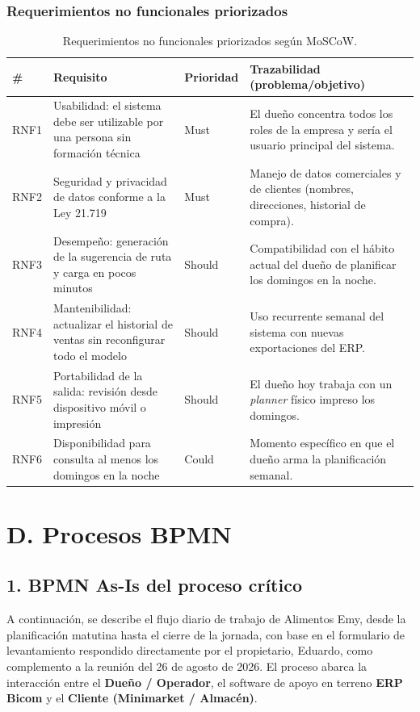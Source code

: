 \documentclass[10pt,a4paper]{article}
\begin{document}
\subsubsection*{Requerimientos no funcionales priorizados}

\begin{table}[H]
\centering
\small
\begin{tabular}{p{0.8cm} p{6.0cm} p{1.6cm} p{6.2cm}}
\toprule
\textbf{\#} & \textbf{Requisito} & \textbf{Prioridad} & \textbf{Trazabilidad (problema/objetivo)} \\
\midrule
RNF1 & Usabilidad: el sistema debe ser utilizable por una persona sin formación técnica & Must & El dueño concentra todos los roles de la empresa y sería el usuario principal del sistema. \\
RNF2 & Seguridad y privacidad de datos conforme a la Ley 21.719 & Must & Manejo de datos comerciales y de clientes (nombres, direcciones, historial de compra). \\
RNF3 & Desempeño: generación de la sugerencia de ruta y carga en pocos minutos & Should & Compatibilidad con el hábito actual del dueño de planificar los domingos en la noche. \\
RNF4 & Mantenibilidad: actualizar el historial de ventas sin reconfigurar todo el modelo & Should & Uso recurrente semanal del sistema con nuevas exportaciones del ERP. \\
RNF5 & Portabilidad de la salida: revisión desde dispositivo móvil o impresión & Should & El dueño hoy trabaja con un \textit{planner} físico impreso los domingos. \\
RNF6 & Disponibilidad para consulta al menos los domingos en la noche & Could & Momento específico en que el dueño arma la planificación semanal. \\
\bottomrule
\end{tabular}
\caption{Requerimientos no funcionales priorizados según MoSCoW.}
\label{tab:rnf-moscow}
\end{table}

\section*{D. Procesos BPMN}

\subsection*{1. BPMN As-Is del proceso crítico}

A continuación, se describe el flujo diario de trabajo de Alimentos Emy, desde la planificación matutina hasta el cierre de la jornada, con base en el formulario de levantamiento respondido directamente por el propietario, Eduardo, como complemento a la reunión del 26 de agosto de 2026. El proceso abarca la interacción entre el \textbf{Dueño / Operador}, el software de apoyo en terreno \textbf{ERP Bicom} y el \textbf{Cliente (Minimarket / Almacén)}.
\end{document}
